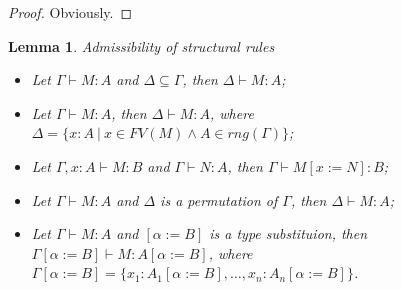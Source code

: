 \documentclass[a4paper]{article}
\newtheorem{lemma}{Lemma}
\begin{document}
\begin{proof}

  Obviously.

\end{proof}

\begin{lemma} Admissibility of structural rules

  \begin{itemize}
    \item Let $\Gamma \vdash M : A$ and $\Delta \subseteq \Gamma$, then $\Delta \vdash M : A$;
    \item Let $\Gamma \vdash M : A$, then $\Delta \vdash M : A$, where $\Delta = \{ x : A \: | \: x \in FV(M) \land A \in rng(\Gamma)\}$;
    \item Let $\Gamma, x : A \vdash M : B$ and $\Gamma \vdash N : A$, then $\Gamma \vdash M [x := N] : B$;
    \item Let $\Gamma \vdash M : A$ and $\Delta$ is a permutation of $\Gamma$, then $\Delta \vdash M : A$;
    \item Let $\Gamma \vdash M : A$ and $[\alpha := B]$ is a type substituion, then $\Gamma [\alpha := B] \vdash M : A [\alpha := B]$,
    where $\Gamma [\alpha := B] = \{ x_1 : A_1 [\alpha := B], \dots, x_n : A_n [\alpha := B]\}$.
  \end{itemize}
\end{lemma}
\end{document}
